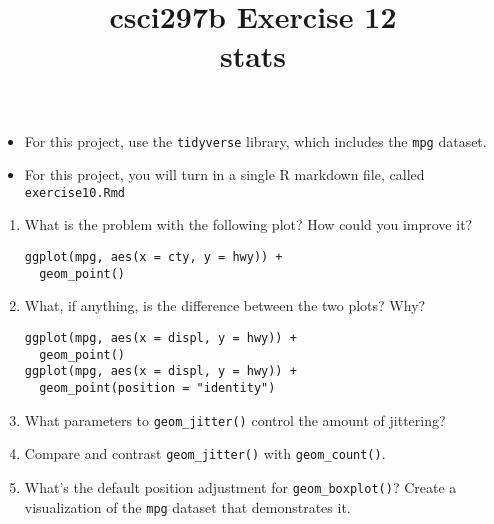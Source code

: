 \documentclass[12pt]{article}
\title{csci297b Exercise 12\\stats
  }
\date{}
\newcommand{\bi}{\begin{itemize}}
\newcommand{\ei}{\end{itemize}}
\newcommand{\li}{\item}
\begin{document}
\maketitle

\bi
\li
For this project, use the {\tt tidyverse} library, which includes the {\tt mpg} dataset.
\li
For this project, you will turn in a single R markdown file, called \verb|exercise10.Rmd|

\ei
\begin{enumerate}
\item
What is the problem with the following plot? How could you improve it?
\begin{verbatim}
ggplot(mpg, aes(x = cty, y = hwy)) + 
  geom_point()
\end{verbatim}
\item
What, if anything, is the difference between the two plots? Why?
\begin{verbatim}
ggplot(mpg, aes(x = displ, y = hwy)) +
  geom_point()
ggplot(mpg, aes(x = displ, y = hwy)) +
  geom_point(position = "identity")
\end{verbatim}
\item
What parameters to \verb|geom_jitter()| control the amount of jittering?
\item
Compare and contrast \verb|geom_jitter()| with \verb|geom_count()|.
\item
What’s the default position adjustment for \verb|geom_boxplot()|? Create a visualization of the 
\verb|mpg| dataset that demonstrates it.

\end{enumerate}
\end{document}
